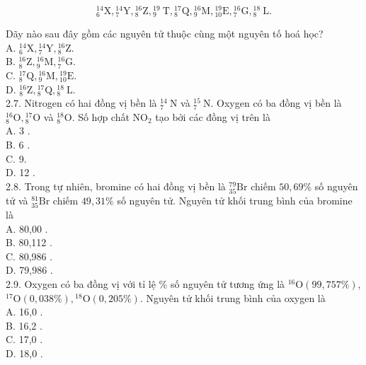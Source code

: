 \documentclass[10pt]{article}
\begin{document}
$$
{ }_{6}^{14} \mathrm{X},{ }_{7}^{14} \mathrm{Y},{ }_{8}^{16} \mathrm{Z},{ }_{9}^{19} \mathrm{~T},{ }_{8}^{17} \mathrm{Q},{ }_{9}^{16} \mathrm{M},{ }_{10}^{19} \mathrm{E},{ }_{7}^{16} \mathrm{G},{ }_{8}^{18} \mathrm{~L} .
$$

Dãy nào sau đây gồm các nguyên tử thuộc cùng một nguyên tố hoá học?\\
A. ${ }_{6}^{14} \mathrm{X},{ }_{7}^{14} \mathrm{Y},{ }_{8}^{16} \mathrm{Z}$.\\
B. ${ }_{8}^{16} \mathrm{Z},{ }_{9}^{16} \mathrm{M},{ }_{7}^{16} \mathrm{G}$.\\
C. ${ }_{8}^{17} \mathrm{Q},{ }_{9}^{16} \mathrm{M},{ }_{10}^{19} \mathrm{E}$.\\
D. ${ }_{8}^{16} \mathrm{Z},{ }_{8}^{17} \mathrm{Q},{ }_{8}^{18} \mathrm{~L}$.\\
2.7. Nitrogen có hai đồng vị bền là ${ }_{7}^{14} \mathrm{~N}$ và ${ }_{7}^{15} \mathrm{~N}$. Oxygen có ba đồng vị bền là ${ }_{8}^{16} \mathrm{O},{ }_{8}^{17} \mathrm{O}$ và ${ }_{8}^{18} \mathrm{O}$. Số hợp chất $\mathrm{NO}_{2}$ tạo bởi các đồng vị trên là\\
A. 3 .\\
B. 6 .\\
C. 9.\\
D. 12 .\\
2.8. Trong tự nhiên, bromine có hai đồng vị bền là ${ }_{35}^{79} \mathrm{Br}$ chiếm $50,69 \%$ số nguyên tử và ${ }_{35}^{81} \mathrm{Br}$ chiếm $49,31 \%$ số nguyên tử. Nguyên tử khối trung bình của bromine là\\
A. 80,00 .\\
B. 80,112 .\\
C. 80,986 .\\
D. 79,986 .\\
2.9. Oxygen có ba đồng vị với tỉ lệ \% số nguyên tử tương ứng là ${ }^{16} \mathrm{O}(99,757 \%)$, ${ }^{17} \mathrm{O}(0,038 \%),{ }^{18} \mathrm{O}(0,205 \%)$. Nguyên tử khối trung bình của oxygen là\\
A. 16,0 .\\
B. 16,2 .\\
C. 17,0 .\\
D. 18,0 .
\end{document}
